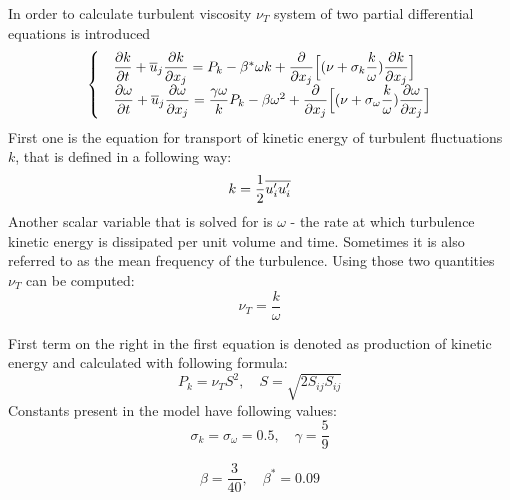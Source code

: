         In order to calculate turbulent viscosity $\nu_T$ system of two partial differential equations is introduced
        \begin{equation}
            \begin{cases}
            &\pderiv{k}{t} + \rans{u}_j \pderiv{k}{x_j} = P_k - \beta^*\omega k + %
            \pderiv{}{x_j}\Big[ (\nu + \sigma_k \dfrac{k}{\omega}) \pderiv{k}{x_j} \Big]\\
            &\pderiv{\omega}{t} + \rans{u}_j \pderiv{\omega}{x_j} = \dfrac{\gamma \omega}{k}P_k - \beta\omega^2 + %
            \pderiv{}{x_j}\Big[ (\nu + \sigma_\omega \dfrac{k}{\omega}) \pderiv{\omega}{x_j} \Big]
            \end{cases}
        \end{equation}
        First one is the equation for transport of kinetic energy of turbulent fluctuations $k$, that is defined in a following way:
        \begin{equation}
            k = \dfrac{1}{2}\overline{{u'_i u'_i}}
            \label{eq:k_def}
        \end{equation}
        Another scalar variable that is solved for is $\omega$ - the rate at which turbulence kinetic energy is dissipated per unit volume and time. Sometimes it is also referred to as the mean frequency of the turbulence. 
        Using those two quantities $\nu_T$ can be computed:
        \begin{equation}
            \nu_T = \dfrac{k}{\omega}
        \end{equation}


        First term on the right in the first equation is denoted as production of kinetic energy and calculated with following formula:
        \begin{equation}
            P_k = \nu_T S^2,\quad S = \sqrt{2S_{ij}S_{ij} }
        \end{equation}
        Constants present in the model have following values:
        \begin{equation*}
            \sigma_k = \sigma_\omega = 0.5,\quad \gamma = \dfrac{5}{9}
        \end{equation*}

        \begin{equation*}
            \beta = \dfrac{3}{40},\quad \beta^* = 0.09
        \end{equation*}

